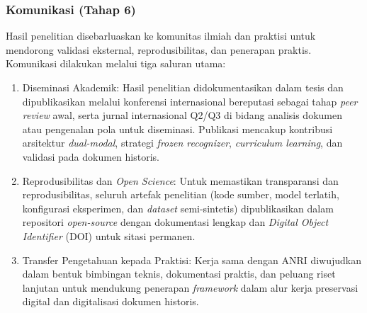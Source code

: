 \subsubsection{Komunikasi (Tahap 6)}
Hasil penelitian disebarluaskan ke komunitas ilmiah dan praktisi untuk mendorong validasi eksternal, reprodusibilitas, dan penerapan praktis. Komunikasi dilakukan melalui tiga saluran utama:

\begin{enumerate}[label=(\arabic*), nosep, leftmargin=0pt, itemindent=1.5em]
    \item Diseminasi Akademik: Hasil penelitian didokumentasikan dalam tesis dan dipublikasikan melalui konferensi internasional bereputasi sebagai tahap \textit{peer review} awal, serta jurnal internasional Q2/Q3 di bidang analisis dokumen atau pengenalan pola untuk diseminasi. Publikasi mencakup kontribusi arsitektur \textit{dual-modal}, strategi \textit{frozen recognizer}, \textit{curriculum learning}, dan validasi pada dokumen historis.
    
    \item Reprodusibilitas dan \textit{Open Science}: Untuk memastikan transparansi dan reprodusibilitas, seluruh artefak penelitian (kode sumber, model terlatih, konfigurasi eksperimen, dan \textit{dataset} semi-sintetis) dipublikasikan dalam repositori \textit{open-source} dengan dokumentasi lengkap dan \textit{Digital Object Identifier} (DOI) untuk sitasi permanen.
    
    \item Transfer Pengetahuan kepada Praktisi: Kerja sama dengan ANRI diwujudkan dalam bentuk bimbingan teknis, dokumentasi praktis, dan peluang riset lanjutan untuk mendukung penerapan \textit{framework} dalam alur kerja preservasi digital dan digitalisasi dokumen historis.
\end{enumerate}


% 



